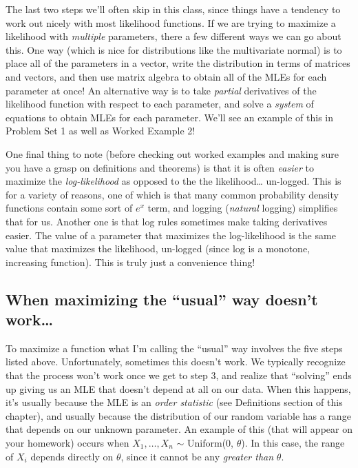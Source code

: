 \documentclass[
  letterpaper,
  DIV=11,
  numbers=noendperiod]{scrreprt}
\begin{document}
The last two steps we'll often skip in this class, since things have a
tendency to work out nicely with most likelihood functions. If we are
trying to maximize a likelihood with \emph{multiple} parameters, there a
few different ways we can go about this. One way (which is nice for
distributions like the multivariate normal) is to place all of the
parameters in a vector, write the distribution in terms of matrices and
vectors, and then use matrix algebra to obtain all of the MLEs for each
parameter at once! An alternative way is to take \emph{partial}
derivatives of the likelihood function with respect to each parameter,
and solve a \emph{system} of equations to obtain MLEs for each
parameter. We'll see an example of this in Problem Set 1 as well as
Worked Example 2!

One final thing to note (before checking out worked examples and making
sure you have a grasp on definitions and theorems) is that it is often
\emph{easier} to maximize the \emph{log-likelihood} as opposed to the
the likelihood\ldots{} un-logged. This is for a variety of reasons, one
of which is that many common probability density functions contain some
sort of \(e^x\) term, and logging (\emph{natural} logging) simplifies
that for us. Another one is that log rules sometimes make taking
derivatives easier. The value of a parameter that maximizes the
log-likelihood is the same value that maximizes the likelihood,
un-logged (since log is a monotone, increasing function). This is truly
just a convenience thing!

\subsection*{When maximizing the ``usual'' way doesn't
work\ldots{}}\label{when-maximizing-the-usual-way-doesnt-work}

To maximize a function what I'm calling the ``usual'' way involves the
five steps listed above. Unfortunately, sometimes this doesn't work. We
typically recognize that the process won't work once we get to step 3,
and realize that ``solving'' ends up giving us an MLE that doesn't
depend at all on our data. When this happens, it's usually because the
MLE is an \emph{order statistic} (see Definitions section of this
chapter), and usually because the distribution of our random variable
has a range that depends on our unknown parameter. An example of this
(that will appear on your homework) occurs when \(X_1, \dots, X_n\)
\(\sim\) Uniform(0, \(\theta\)). In this case, the range of \(X_i\)
depends directly on \(\theta\), since it cannot be any \emph{greater
than} \(\theta\).
\end{document}
